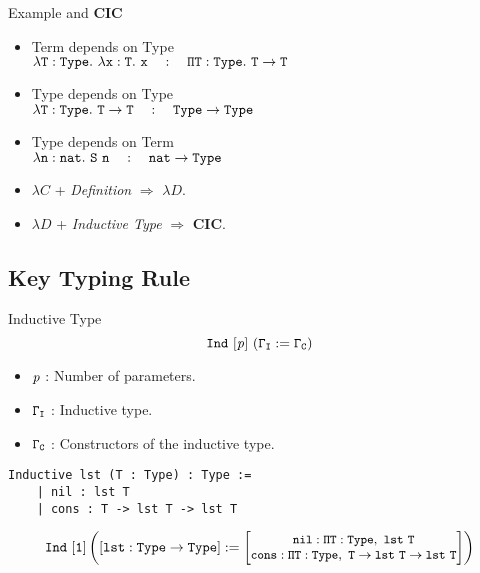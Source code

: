 \documentclass[UTF-8]{beamer}
\begin{document}
\begin{frame}{Example and \textbf{CIC}}
\begin{itemize}
\item Term depends on Type\\
    $\tt\lambda T:Type.\ \lambda x:T.\ x\quad :\quad \Pi T:Type.\ T\to T$
\item Type depends on Type\\
    $\tt\lambda T:Type.\ T\to T\quad :\quad Type\to Type$
\item Type depends on Term\\
    $\tt\lambda n:nat.\ S\ n\quad :\quad nat\to Type$
        \vspace{10pt}
\item $\lambda C$ + \textit{Definition} $\Rightarrow$ $\lambda D$.\\
\item $\lambda D$ + \textit{Inductive Type} $\Rightarrow$ \textbf{CIC}.
\end{itemize}
\end{frame}

\subsection{Key Typing Rule}
\begin{frame}[fragile]{Inductive Type}
$$
\tt Ind\ [{\it p}]\ (\Gamma_I:=\Gamma_C)
$$
\vspace{-10pt}
\begin{itemize}
\item $\it p$ : Number of parameters.
\item $\tt \Gamma_I$ : Inductive type.
\item $\tt \Gamma_C$ : Constructors of the inductive type.
\end{itemize}
\vspace{10pt}
\begin{verbatim}
Inductive lst (T : Type) : Type :=
    | nil : lst T
    | cons : T -> lst T -> lst T
\end{verbatim}
$$
\small
\tt Ind\ [1]\left([lst:Type\to Type]:=
\begin{bmatrix}
\tt nil:\Pi T:Type,\ lst\ T\\
\tt cons:\Pi T:Type,\ T\to lst\ T\to lst\ T
\end{bmatrix}\right)
$$
\end{frame}
\end{document}

